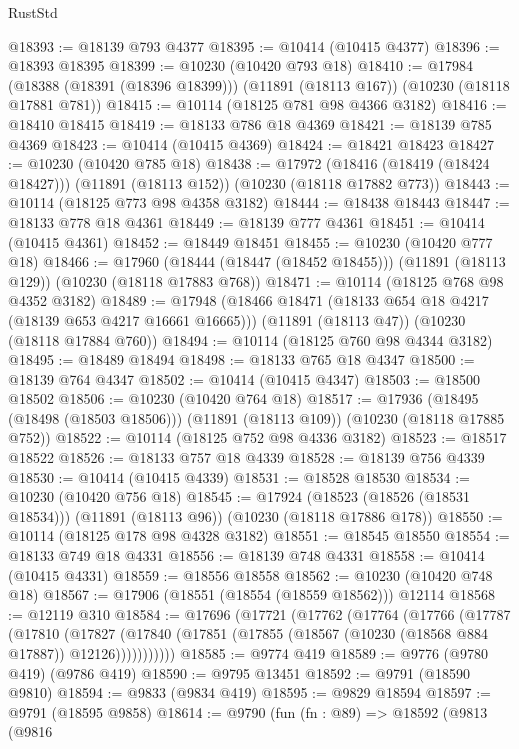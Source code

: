 \begin{lexlean}{RustStd}
\begin{coremodule}
@18393 := @18139 @793 @4377
@18395 := @10414 (@10415 @4377)
@18396 := @18393 @18395
@18399 := @10230 (@10420 @793 @18)
@18410 := @17984
    (@18388 (@18391 (@18396 @18399)))
    (@11891 (@18113 @167))
    (@10230 (@18118 @17881 @781))
@18415 := @10114 (@18125 @781 @98 @4366 @3182)
@18416 := @18410 @18415
@18419 := @18133 @786 @18 @4369
@18421 := @18139 @785 @4369
@18423 := @10414 (@10415 @4369)
@18424 := @18421 @18423
@18427 := @10230 (@10420 @785 @18)
@18438 := @17972
    (@18416 (@18419 (@18424 @18427)))
    (@11891 (@18113 @152))
    (@10230 (@18118 @17882 @773))
@18443 := @10114 (@18125 @773 @98 @4358 @3182)
@18444 := @18438 @18443
@18447 := @18133 @778 @18 @4361
@18449 := @18139 @777 @4361
@18451 := @10414 (@10415 @4361)
@18452 := @18449 @18451
@18455 := @10230 (@10420 @777 @18)
@18466 := @17960
    (@18444 (@18447 (@18452 @18455)))
    (@11891 (@18113 @129))
    (@10230 (@18118 @17883 @768))
@18471 := @10114 (@18125 @768 @98 @4352 @3182)
@18489 := @17948
    (@18466 @18471 (@18133 @654 @18 @4217 (@18139 @653 @4217 @16661 @16665)))
    (@11891 (@18113 @47))
    (@10230 (@18118 @17884 @760))
@18494 := @10114 (@18125 @760 @98 @4344 @3182)
@18495 := @18489 @18494
@18498 := @18133 @765 @18 @4347
@18500 := @18139 @764 @4347
@18502 := @10414 (@10415 @4347)
@18503 := @18500 @18502
@18506 := @10230 (@10420 @764 @18)
@18517 := @17936
    (@18495 (@18498 (@18503 @18506)))
    (@11891 (@18113 @109))
    (@10230 (@18118 @17885 @752))
@18522 := @10114 (@18125 @752 @98 @4336 @3182)
@18523 := @18517 @18522
@18526 := @18133 @757 @18 @4339
@18528 := @18139 @756 @4339
@18530 := @10414 (@10415 @4339)
@18531 := @18528 @18530
@18534 := @10230 (@10420 @756 @18)
@18545 := @17924
    (@18523 (@18526 (@18531 @18534)))
    (@11891 (@18113 @96))
    (@10230 (@18118 @17886 @178))
@18550 := @10114 (@18125 @178 @98 @4328 @3182)
@18551 := @18545 @18550
@18554 := @18133 @749 @18 @4331
@18556 := @18139 @748 @4331
@18558 := @10414 (@10415 @4331)
@18559 := @18556 @18558
@18562 := @10230 (@10420 @748 @18)
@18567 := @17906 (@18551 (@18554 (@18559 @18562))) @12114
@18568 := @12119 @310
@18584 := @17696
    (@17721
      (@17762
        (@17764
          (@17766
            (@17787
              (@17810
                (@17827
                  (@17840 (@17851 (@17855 (@18567 (@10230 (@18568 @884 @17887)) @12126)))))))))))
@18585 := @9774 @419
@18589 := @9776 (@9780 @419) (@9786 @419)
@18590 := @9795 @13451
@18592 := @9791 (@18590 @9810)
@18594 := @9833 (@9834 @419)
@18595 := @9829 @18594
@18597 := @9791 (@18595 @9858)
@18614 := @9790
    (fun (fn : @89) =>
    @18592
      (@9813
        (@9816

\end{coremodule}
\end{lexlean}
